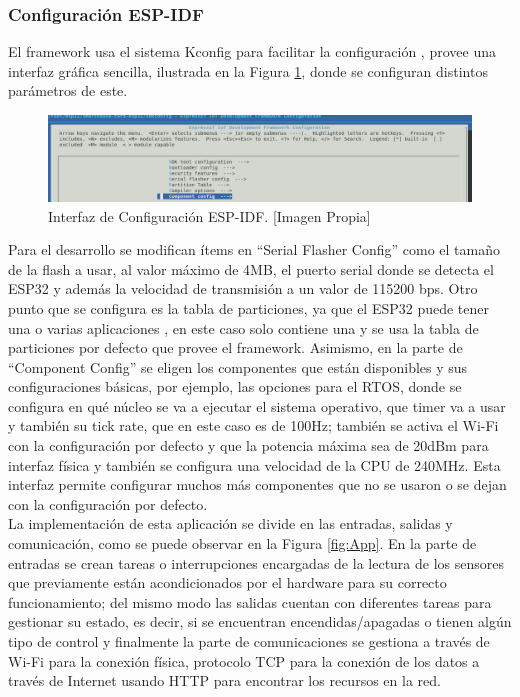 \subsubsection{Configuración ESP-IDF}

El framework usa el sistema Kconfig para facilitar la configuración \cite{ES}, provee una interfaz gráfica sencilla, ilustrada en la Figura \ref{fig:Kconf}, donde se configuran distintos parámetros de este.

\begin{figure}[H]
	\centering
	\caption[Interfaz de Configuración ESP-IDF.]{Interfaz de Configuración ESP-IDF. [Imagen Propia]}
	\label{fig:Kconf}
	\includegraphics[width=\linewidth]{Imagenes/Kgui}
\end{figure}

Para el desarrollo se modifican ítems en ``Serial Flasher Config'' como el tamaño de la flash a usar, al valor máximo de 4MB, el puerto serial donde se detecta el ESP32 y además la velocidad de transmisión a un valor de 115200 bps. Otro punto que se configura es la tabla de particiones, ya que el ESP32 puede tener una o varias aplicaciones \cite{ES}, en este caso solo contiene una y se usa la tabla de particiones por defecto que provee el framework. Asimismo, en la parte de ``Component Config'' se eligen los componentes que están disponibles y sus configuraciones básicas, por ejemplo, las opciones para el RTOS, donde se configura en qué núcleo se va a ejecutar el sistema operativo, que timer va a usar y también su tick rate, que en este caso es de 100Hz; también se activa el Wi-Fi con la configuración por defecto y que la potencia máxima sea de 20dBm para interfaz física y también se configura una velocidad de la CPU de 240MHz. Esta interfaz permite configurar muchos más componentes que no se usaron o se dejan con la configuración por defecto.\\


La implementación de esta aplicación se divide en las entradas, salidas y comunicación, como se puede observar en la Figura \ref{fig:App}. En la parte de entradas se crean tareas o interrupciones encargadas de la lectura de los sensores que previamente están acondicionados por el hardware para su correcto funcionamiento; del mismo modo las salidas cuentan con diferentes tareas para gestionar su estado, es decir, si se encuentran encendidas/apagadas o tienen algún tipo de control y finalmente la parte de comunicaciones se gestiona a través de Wi-Fi para la conexión física, protocolo TCP para la conexión de los datos a través de Internet usando HTTP para encontrar los recursos en la red.

